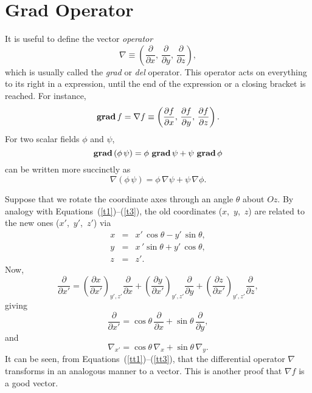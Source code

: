 \section{Grad Operator}\label{sgradx}
It is useful to define the vector {\em operator}
\begin{equation}
\nabla \equiv \left( \frac{\partial}{\partial x},\, \frac{\partial}{\partial y},\,
\frac{\partial }{\partial z}\right),
\end{equation}
which is usually called the {\em grad}\/ or  {\em del}\/ operator. 
This operator acts on everything to
its right in a expression,   until the end of the expression
or a closing bracket is reached.
For instance,
\begin{equation}
{\bf grad}\,f  = \nabla f \equiv \left(\frac{\partial f}{\partial x},\,
\frac{\partial f}{\partial y},\,\frac{\partial f}{\partial z}\right).
\end{equation}
For two scalar fields $\phi$ and $\psi$,
\begin{equation}
{\bf grad}\,(\phi \,\psi) = \phi\,\, {\bf grad}\,\psi +\psi\,\, {\bf grad}\,\phi
\end{equation}
can be written more succinctly as
\begin{equation}
\nabla(\phi\, \psi) = \phi \,\nabla\psi + \psi\, \nabla \phi.
\end{equation}

Suppose that we rotate the coordinate axes through an angle $\theta$  about $Oz$. 
By analogy with Equations~(\ref{t1})--(\ref{t3}), the old coordinates ($x$,\, $y$, \,$z$) are related 
to the new ones ($x'$, \,$y'$,\, $z'$) via
\begin{eqnarray}
x &=& x'\, \cos\theta - y'\,\sin\theta,\\[0.5ex]
y &=& x\,'\sin\theta +y'\,\cos\theta,\\[0.5ex]
z&=& z'.
\end{eqnarray}
Now,
\begin{equation}
\frac{\partial}{\partial x'} = \left(\frac{\partial x}{\partial x'} \right)_{y',z'}
\frac{\partial}{\partial x}+\left(\frac{\partial y}{\partial x'} \right)_{y',z'}
\frac{\partial}{\partial y}+\left(\frac{\partial z}{\partial x'} \right)_{y',z'}
\frac{\partial}{\partial z},
\end{equation}
giving
\begin{equation}
\frac{\partial}{\partial x'} = \cos\theta \,\frac{\partial}{\partial x} + 
\sin\theta \,\frac{\partial}{\partial y},
\end{equation}
and 
\begin{equation}
\nabla_{x'} = \cos\theta\, \nabla_x + \sin\theta \,\nabla_y.
\end{equation}
It can be seen, from  Equations~(\ref{tt1})--(\ref{tt3}), that 
the differential operator $\nabla$ transforms in an analogous manner to
a vector.
 This is another proof that $\nabla f$ is a good  vector.
 
